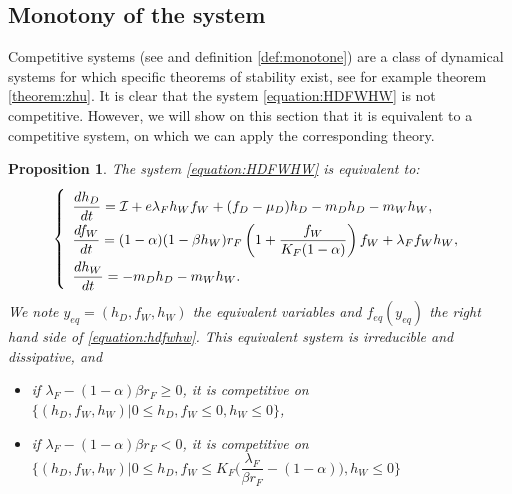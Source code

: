 \documentclass{article}
\newcommand{\lfw}{\lambda_{F}}
\newcommand{\lfw}{\lambda_{F}}
\newcommand{\cI}{\mathcal{I}}
\newtheorem{prop}{Proposition}
\begin{document}
\subsection{Monotony of the system}
Competitive systems (see \cite{smith_monotone_1995} and definition \ref{def:monotone}) are a class of dynamical systems for which specific theorems of stability exist, see for example theorem \ref{theorem:zhu}. It is clear that the system \eqref{equation:HDFWHW} is not competitive. However, we will show on this section that it is equivalent to a competitive system, on which we can apply the corresponding theory.

\begin{prop} \label{prop: equivalentSystem}
The system \eqref{equation:HDFWHW} is equivalent to:
\begin{equation}
\def\arraystretch{2}
\left\{ \begin{array}{l}
\dfrac{dh_D}{dt}= \cI + e\lfw h_W f_W + (f_D - \mu_D) h_D - m_D h_D - m_W h_W, \\
\dfrac{df_W}{dt} = (1-\alpha)(1 - \beta h_W) r_F \left(1 + \dfrac{f_W}{K_F(1-\alpha)} \right) f_W + \lfw f_W h_W, \\
\dfrac{dh_W}{dt}= -m_D h_D - m_W h_W. 
\end{array} \right.
\label{equation:hdfwhw}
\end{equation}
We note $y_{eq} = (h_D, f_W, h_W)$ the equivalent variables and $f_{eq}(y_{eq})$ the right hand side of \eqref{equation:hdfwhw}. This equivalent system is irreducible and dissipative, and
\begin{itemize}
\item if $\lfw - (1-\alpha)\beta r_F \geq 0$, it is competitive on $\Big\{(h_D, f_W, h_W) | 0 \leq h_D, f_W  \leq 0, h_W \leq 0 \Big\}$,
\item if $\lfw - (1-\alpha)\beta r_F < 0$, it is competitive on $\Big\{(h_D, f_W, h_W) | 0 \leq h_D, f_W \leq K_F\big(\dfrac{\lfw}{\beta r_F}-(1-\alpha)\big), h_W \leq 0 \Big\}$ 
\end{itemize}

\end{prop}
\end{document}

